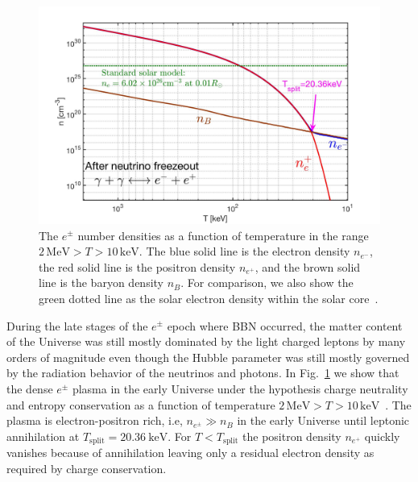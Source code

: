 \documentclass[universe,article,submit,moreauthors,pdftex,a4paper]{Definitions/mdpi}
\newcommand*{\rf}[1]{Fig.~{\ref{#1}}}
\begin{document}
\begin{figure}[ht]
\centerline{\includegraphics[width=\textwidth]{./plots/NewDensity_cm3_new.jpg}}
\caption{The $e^{\pm}$ number densities as a function of temperature in the range $2\,\mathrm{MeV}>T>10\,\mathrm{keV}$. The blue solid line is the electron density $n_{e^{-}}$, the red solid line is the positron density $n_{e^{+}}$, and the brown solid line is the baryon density $n_{B}$. For comparison, we also show the green dotted line as the solar electron density within the solar core~\cite{Bahcall:2000nu}.}
\label{Density_fig} 
\end{figure}

During the late stages of the $e^{\pm}$ epoch where BBN occurred, the matter content of the Universe was still mostly dominated by the light charged leptons by many orders of magnitude even though the Hubble parameter was still mostly governed by the radiation behavior of the neutrinos and photons. In \rf{Density_fig} we show that the dense $e^{\pm}$ plasma in the early Universe under the hypothesis charge neutrality and entropy conservation as a function of temperature $2\,\mathrm{MeV}>T>10\,\mathrm{keV}$~\cite{Chris:2023abc}. The plasma is electron-positron rich, i.e, $n_{e^\pm}\gg n_B$ in the early Universe until leptonic annihilation at $T_{\mathrm{split}} = 20.36\ \mathrm{keV}$. For $T<T_{\mathrm{split}}$ the positron density $n_{e^{+}}$ quickly vanishes because of annihilation leaving only a residual electron density as required by charge conservation.
\end{document}
